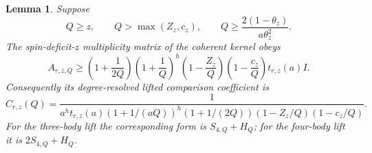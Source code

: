 \documentclass[11pt]{article}
\newtheorem{lemma}{Lemma}
\begin{document}
\begin{lemma}\label{lem:opt-coh}
Suppose
\begin{equation}\label{eq:opt-coh-domain}
 Q\ge z,\qquad Q>\max(Z_z,c_z),\qquad
 Q\ge\frac{2(1-\theta_z)}{a\theta_z^2}.
\end{equation}
The spin-deficit-$z$ multiplicity matrix of the coherent kernel obeys
\begin{equation}\label{eq:opt-coh-block-lower}
 A_{r,z,Q}\ge
 \left(1+\frac1{2Q}\right)\left(1+\frac1Q\right)^h
 \left(1-\frac{Z_z}Q\right)\left(1-\frac{c_z}Q\right)t_{r,z}(a)I.
\end{equation}
Consequently its degree-resolved lifted comparison coefficient is
\begin{equation}\label{eq:opt-coh-coefficient}
 C_{r,z}(Q)=
 \frac1{a^ht_{r,z}(a)(1+1/(aQ))^h(1+1/(2Q))
                 (1-Z_z/Q)(1-c_z/Q)}.
\end{equation}
For the three-body lift the corresponding form is $S_{4,Q}+H_Q$;
for the four-body lift it is $2S_{4,Q}+H_Q$.
\end{lemma}
\end{document}
